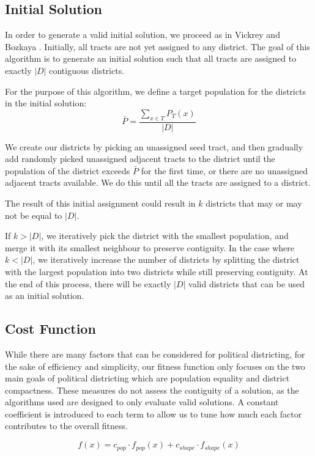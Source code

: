 \documentclass[journal]{IEEEtran}
\begin{document}
\subsection{Initial Solution}
In order to generate a valid initial solution, we proceed as in Vickrey
\cite{initial} and Bozkaya \cite{local-search}.  Initially, all tracts are not
yet assigned to any district. The goal of this algorithm is to generate an
initial solution such that all tracts are assigned to exactly $|D|$ contiguous
districts.

For the purpose of this algorithm, we define a target population for the
districts in the initial solution:
$$\bar{P} = \frac{\sum_{x \in T} P_T(x)}{|D|}$$

We create our districts by picking an unassigned seed tract, and then gradually
add randomly picked unassigned adjacent tracts to the district until the
population of the district exceeds $\bar{P}$ for the first time, or there are no
unassigned adjacent tracts available. We do this until all the tracts are
assigned to a district.

The result of this initial assignment could result in $k$ districts that may or
may not be equal to $|D|$.

If $k > |D|$, we iteratively pick the district with the smallest population, and
merge it with its smallest neighbour to preserve contiguity. In the case where
$k < |D|$, we iteratively increase the number of districts by splitting the
district with the largest population into two districts while still preserving
contiguity. At the end of this process, there will be exactly $|D|$ valid
districts that can be used as an initial solution.

\subsection{Cost Function}
While there are many factors that can be considered for political districting,
for the sake of efficiency and simplicity, our fitness function only focuses on
the two main goals of political districting which are population equality and
district compactness.  These measures do not assess the contiguity of a
solution, as the algorithms used are designed to only evaluate valid solutions.
A constant coefficient is introduced to each term to allow us to tune how much
each factor contributes to the overall fitness.

$$f(x) = c_{pop} \cdot f_{pop}(x) + c_{shape} \cdot f_{shape}(x)$$
\end{document}
